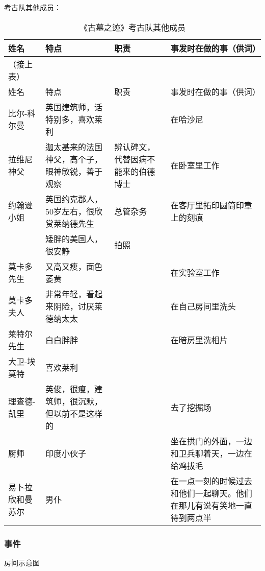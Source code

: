 考古队其他成员：
\begin{longtable}{p{} | p{} | p{} | p{}}
    \caption{《古墓之迹》考古队其他成员} \\
    \hline
姓名 & 特点 & 职责 & 事发时在做的事（供词） \\
\hline
\endfirsthead

（接上表） \\
姓名 & 特点 & 职责 & 事发时在做的事（供词） \\
\hline
\endhead

\hline
\endfoot
比尔-科尔曼 & 英国建筑师，话特别多，喜欢莱利 & & 在哈沙尼 \\
拉维尼神父 & 迦太基来的法国神父，高个子，眼神敏锐，善于观察 & 辨认碑文，代替因病不能来的伯德博士 & 在卧室里工作 \\
约翰逊小姐 & 英国约克郡人，50岁左右，很欣赏莱纳德先生 & 总管杂务 & 在客厅里拓印圆筒印章上的刻痕 \\
 &	矮胖的美国人，很安静 & 拍照	& \\
莫卡多先生 & 又高又瘦，面色萎黄	& &	在实验室工作 \\
莫卡多夫人 & 非常年轻，看起来阴险，讨厌莱德纳太太 & & 在自己房间里洗头 \\
莱特尔先生 & 白白胖胖 & & 在暗房里洗相片 \\
大卫-埃莫特 & 喜欢莱利	& & \\	
理查德-凯里 & 英俊，很瘦，建筑师，很沉默，但以前不是这样的 & & 去了挖掘场 \\
厨师 & 印度小伙子 & & 坐在拱门的外面，一边和卫兵聊着天，一边在给鸡拔毛 \\
易卜拉欣和曼苏尔 & 男仆  & & 在一点一刻的时候过去和他们一起聊天。他们在那儿有说有笑地一直待到两点半 \\

\end{longtable}

\subsubsection{事件}

房间示意图

